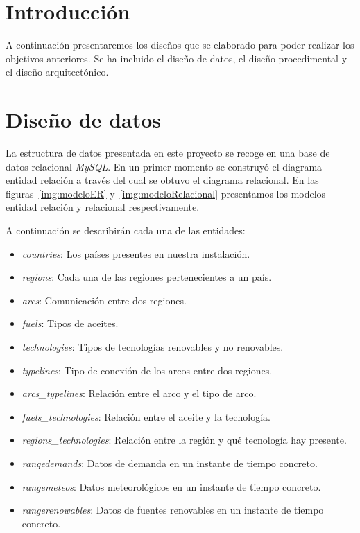 
\section{Introducción}

A continuación presentaremos los diseños que se elaborado para poder realizar los objetivos anteriores. Se ha incluido el diseño de datos, el diseño procedimental y el diseño arquitectónico.

\section{Diseño de datos}

La estructura de datos presentada en este proyecto se recoge en una base de datos relacional \textit{MySQL}. En un primer momento se construyó el diagrama entidad relación a través del cual se obtuvo el diagrama relacional. En las figuras~\ref{img:modeloER} y~\ref{img:modeloRelacional} presentamos los modelos entidad relación y relacional respectivamente.

A continuación se describirán cada una de las entidades:

\begin{itemize}
	
	\item \textit{countries}: Los países presentes en nuestra instalación.
	
	\item \textit{regions}: Cada una de las regiones pertenecientes a un país.
	
	\item \textit{arcs}: Comunicación entre dos regiones.
	
	\item \textit{fuels}: Tipos de aceites.
	
	\item \textit{technologies}: Tipos de tecnologías renovables y no renovables.
	
	\item \textit{typelines}: Tipo de conexión de los arcos entre dos regiones.
	
	\item \textit{arcs\_typelines}: Relación entre el arco y el tipo de arco.
	
	\item \textit{fuels\_technologies}: Relación entre el aceite y la tecnología.
	
	\item \textit{regions\_technologies}: Relación entre la región y qué tecnología hay presente.
	
	\item \textit{rangedemands}: Datos de demanda en un instante de tiempo concreto.
	
	\item \textit{rangemeteos}: Datos meteorológicos en un instante de tiempo concreto.
	
	\item \textit{rangerenowables}: Datos de fuentes renovables en un instante de tiempo concreto.

\end{itemize}


